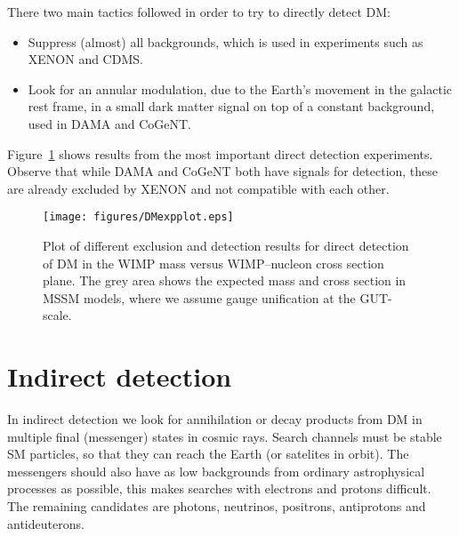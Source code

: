 \documentclass[notes.tex]{subfiles}
\begin{document}
There two main tactics followed in order to try to directly detect DM:
\begin{itemize}
\item Suppress (almost) all backgrounds, which is used in experiments such as XENON and CDMS.
\item Look for an annular modulation, due to the Earth's movement in the galactic rest frame, in a small dark matter signal on top of a constant background, used in DAMA and CoGeNT.
\end{itemize}

Figure~\ref{DD} shows results from the most important direct detection experiments. Observe that while DAMA and CoGeNT both have signals for detection, these are already excluded by XENON and not compatible with each other. 

\begin{figure}[h!]
\begin{center}
\texttt{[image: figures/DMexpplot.eps]} 
\caption{Plot of different exclusion and detection results for direct detection of DM in the WIMP mass versus WIMP--nucleon cross section plane. The grey area shows the expected mass and cross section in MSSM models, where we assume gauge unification at the GUT-scale. \label{DD}}
\end{center}
\end{figure}


\section{Indirect detection}
In indirect detection we look for annihilation or decay products from DM in multiple final (messenger) states in cosmic rays. Search channels must be stable SM particles, so that they can reach the Earth (or satelites in orbit). The messengers should also have as low backgrounds from ordinary astrophysical processes as possible, this makes searches with electrons and protons difficult. The remaining candidates are photons, neutrinos, positrons, antiprotons and antideuterons. 
\end{document}
